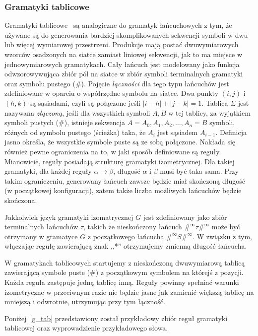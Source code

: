 \subsubsection{Gramatyki tablicowe}
Gramatyki tablicowe~\cite{chanda} są analogiczne do gramatyk łańcuchowych z
tym, że używane są do generowania bardziej skomplikowanych sekwencji symboli w dwu lub więcej
wymiarowej przestrzeni. Produkcje mają postać dwuwymiarowych wzorców osadzonych
na siatce zamiast liniowej sekwencji, jak to ma miejsce w jednowymiarowych
gramatykach. Cały łańcuch jest modelowany jako funkcja odwzorowywująca zbiór pól
na siatce w zbiór symboli terminalnych gramatyki oraz symbolu pustego (\#).
Pojęcie {\em łączności} dla tego typu łańcuchów jest zdefiniowane w oparciu o
współrzędne symbolu na siatce. Dwa punkty $(i,j)$ i $(h,k)$ są sąsiadami, czyli
są połączone jeśli $|i-h|+|j-k|=1$.
Tablica $\Sigma$ jest nazywana {\em złączoną}, jeśli dla wszystkich symboli
$A,B$ w tej tablicy, za wyjątkiem symboli pustych (\#), istnieje sekwencja
$A=A_0,A_1,A_2,\ldots,A_n=B$ symboli, różnych od symbolu pustego (ścieżka) taka,
że $A_i$ jest sąsiadem $A_{i-1}$. Definicja jasno określa, że wszystkie symbole
puste są ze sobą połączone. Nakłada się również pewne ograniczenia na to, w jaki
sposób definiowane są reguły. Mianowicie, reguły posiadają strukturę gramatyki
izometrycznej. Dla takiej gramatyki, dla każdej reguły
$\alpha\longrightarrow\beta$, długość $\alpha$ i $\beta$ musi być taka sama.
Przy takim ograniczeniu, generowany łańcuch zawsze będzie miał skończoną długość
(w początkowej konfiguracji), zatem także liczba możliwych łańcuchów będzie
skończona.

Jakkolwiek język gramatyki izomatrycznej $G$ jest zdefiniowany jako
zbiór terminalnych łańcuchów $\tau$, takich że nieskończony łańcuch
$\#^\infty\tau\#^\infty$ może być otrzymany w gramatyce $G$ z początkowego
łańcucha $\#^\infty S\#^\infty$. W związku z tym, włączając regułę zawierającą
znak ,,*'' otrzymujemy zmienną długość łańcucha.

W gramatykach tablicowych startujemy z nieskończoną dwuwymiarową tablicą
zawierającą symbole puste (\#) z początkowym symbolem na którejś z pozycji.
Każda reguła zastępuje jedną tablicę inną. Reguły powinny spełniać warunki
izometryczne w przeciwnym razie nie będzie jasne jak zamienić większą tablicę na
mniejszą i odwrotnie, utrzymując przy tym łączność.

Poniżej~\ref{g_tab} przedstawiony został przykładowy zbiór reguł gramatyki
tablicowej oraz wyprowadzienie przykładowego słowa.

